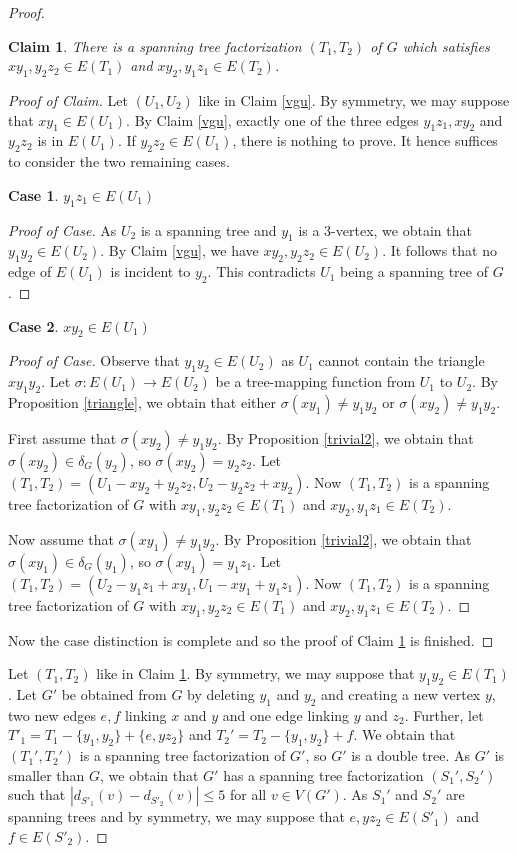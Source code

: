 \documentclass{article}
\theoremstyle{plain}
\newtheorem{Claim}{Claim}
\newtheorem{case}{Case}
\theoremstyle{nonumberplain}
\theoremstyle{nonumberplain}
\newcommand{\stf}{spanning tree factorization }
\begin{document}
\begin{proof}
\begin{Claim}\label{rtg6zhu}
There is a \stf $(T_1,T_2)$ of $G$ which satisfies $xy_1,y_2z_2\in E(T_1)$ and $xy_2,y_1z_1\in E(T_2)$.
\end{Claim}
\begin{proof}[Proof of Claim]
Let $(U_1,U_2)$ like in Claim \ref{vgu}. By symmetry, we may suppose that $xy_1 \in E(U_1)$. By Claim \ref{vgu}, exactly one of the three edges $y_1z_1,xy_2$ and $y_2z_2$ is in $E(U_1)$. If $y_2z_2 \in E(U_1)$, there is nothing to prove. It hence suffices to consider the two remaining cases.
\begin{case}
$y_1z_1 \in E(U_1)$
\end{case}
\begin{proof}[Proof of Case]
As $U_2$ is a spanning tree and $y_1$ is a 3-vertex, we obtain that $y_1y_2 \in E(U_2)$. By Claim \ref{vgu}, we have $xy_2,y_2z_2 \in E(U_2)$. It follows that no edge of $E(U_1)$ is incident to $y_2$. This contradicts $U_1$ being a spanning tree of $G$.
\renewcommand{\qedsymbol}{$\blacksquare$}
\end{proof}
\begin{case}
$xy_2 \in E(U_1)$
\end{case}
\begin{proof}[Proof of Case]
Observe that $y_1y_2 \in E(U_2)$ as $U_1$ cannot contain the triangle $xy_1y_2$. Let $\sigma:E(U_1)\rightarrow E(U_2)$ be a tree-mapping function from $U_1$ to $U_2$. By Proposition \ref{triangle}, we obtain that either $\sigma(xy_1)\neq y_1y_2$ or $\sigma(xy_2)\neq y_1y_2$.

 First assume that $\sigma(xy_2)\neq y_1y_2$. By Proposition \ref{trivial2}, we obtain that $\sigma(xy_2)\in \delta_G(y_2)$, so  $\sigma(xy_2) = y_2z_2$. Let $(T_1,T_2)=(U_1-xy_2+y_2z_2,U_2-y_2z_2+xy_2)$. Now $(T_1,T_2)$ is a \stf of $G$ with $xy_1,y_2z_2\in E(T_1)$ and $xy_2,y_1z_1\in E(T_2)$.

 Now assume that $\sigma(xy_1)\neq y_1y_2$. By Proposition \ref{trivial2}, we obtain that $\sigma(xy_1)\in \delta_G(y_1)$, so  $\sigma(xy_1) = y_1z_1$. Let $(T_1,T_2)=(U_2-y_1z_1+xy_1,U_1-xy_1+y_1z_1)$. Now $(T_1,T_2)$ is a \stf of $G$ with $xy_1,y_2z_2\in E(T_1)$ and $xy_2,y_1z_1\in E(T_2)$.
\renewcommand{\qedsymbol}{$\blacksquare$}
\end{proof}
Now the case distinction is complete and so the proof of Claim \ref{rtg6zhu} is finished.
\renewcommand{\qedsymbol}{$\blacksquare$}
\end{proof}

Let $(T_1,T_2)$ like in Claim \ref{rtg6zhu}. By symmetry, we may suppose that $y_1y_2 \in E(T_1)$. Let $G'$ be obtained from $G$ by deleting $y_1$ and $y_2$ and creating a new vertex $y$, two new edges $e,f$ linking $x$ and $y$ and one edge linking $y$ and $z_2$. Further, let $ T'_1=T_1-\{y_1,y_2\}+\{e,yz_2\}$ and $T_2'=T_2-\{y_1,y_2\}+f$.  We obtain that $(T_1',T_2')$ is a \stf of $G'$, so $G'$ is a double tree. As $G'$ is smaller than $G$, we obtain that $G'$ has a \stf $(S_1',S_2')$ such that $|d_{S'_1}(v)-d_{S'_2}(v)|\leq 5$ for all $v \in V(G')$. As $S_1'$ and $S_2'$ are spanning trees and by symmetry, we may suppose that $e,yz_2 \in E(S'_1)$ and $f \in E(S'_2)$.


\end{proof}
\end{document}
